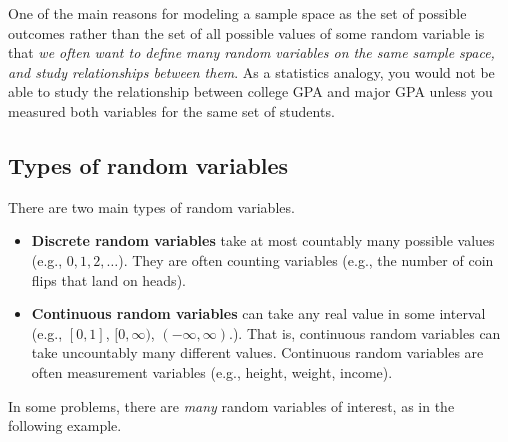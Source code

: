 \documentclass[
  letterpaper,
  DIV=11,
  numbers=noendperiod]{scrreprt}
\providecommand{\tightlist}{%
  \setlength{\itemsep}{0pt}\setlength{\parskip}{0pt}}
\theoremstyle{plain}
\theoremstyle{definition}
\theoremstyle{definition}
\theoremstyle{definition}
\theoremstyle{remark}
\begin{document}
One of the main reasons for modeling a sample space as the set of
possible outcomes rather than the set of all possible values of some
random variable is that \emph{we often want to define many random
variables on the same sample space, and study relationships between
them}. As a statistics analogy, you would not be able to study the
relationship between college GPA and major GPA unless you measured both
variables for the same set of students.

\subsection{Types of random variables}\label{types-of-random-variables}

There are two main types of random variables.

\begin{itemize}
\tightlist
\item
  \textbf{Discrete random variables}
  take at most countably many possible values (e.g.,
  \(0, 1, 2, \ldots\)). They are often counting variables (e.g., the
  number of coin flips that land on heads).
\item
  \textbf{Continuous random variables}
  can take any real value in some interval (e.g., \([0, 1]\),
  \([0,\infty)\), \((-\infty, \infty)\).). That is, continuous random
  variables can take uncountably many different values. Continuous
  random variables are often measurement variables (e.g., height,
  weight, income).
\end{itemize}

In some problems, there are \emph{many} random variables of interest, as
in the following example.
\end{document}
